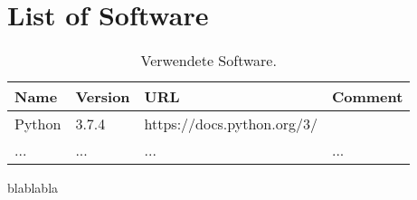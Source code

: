 \chapter*{List of Software}
\label{sec:software}
\begin{table}[htb]
	\centering
		\begin{tabular}{|l|l||l|l|}
		\hline
			\bfseries{Name} & \bfseries{Version} & \bfseries{URL} & \bfseries{Comment}\\
		\hline
		\hline
			Python & 3.7.4 & https://docs.python.org/3/ & \\
		\hline
	... & ... & ... & ... \\
		\hline
		\end{tabular}
	\caption{Verwendete Software.}
	\label{tab:VerwendeteSoftware}
\end{table}

blablabla